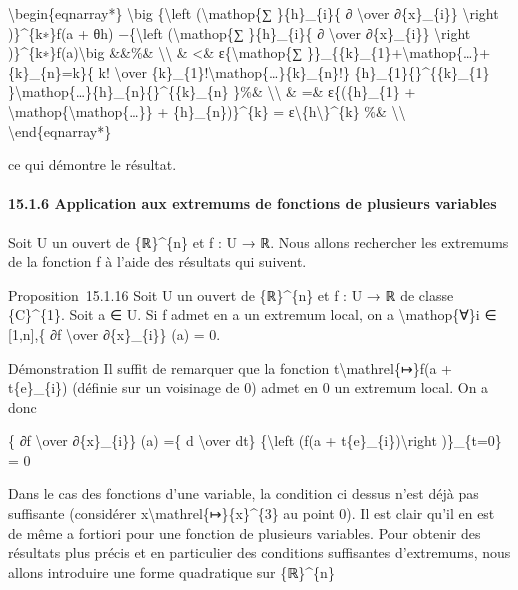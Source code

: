 \documentclass[]{article}
\begin{document}
\textbackslash{}begin\{eqnarray*\} \textbackslash{}big
\textbar{}\{\textbackslash{}left (\textbackslash{}mathop\{∑
\}\{h\}\_\{i\}\{ ∂ \textbackslash{}over ∂\{x\}\_\{i\}\}
\textbackslash{}right )\}\^{}\{k∗\}f(a + θh) −\{\textbackslash{}left
(\textbackslash{}mathop\{∑ \}\{h\}\_\{i\}\{ ∂ \textbackslash{}over
∂\{x\}\_\{i\}\} \textbackslash{}right
)\}\^{}\{k∗\}f(a)\textbackslash{}big \textbar{}\&\&\%\&
\textbackslash{}\textbackslash{} \& \textless{}\&
ε\{\textbackslash{}mathop\{∑
\}\}\_\{\{k\}\_\{1\}+\textbackslash{}mathop\{\ldots{}\}+\{k\}\_\{n\}=k\}\{
k! \textbackslash{}over
\{k\}\_\{1\}!\textbackslash{}mathop\{\ldots{}\}\{k\}\_\{n\}!\}
\textbar{}\{h\}\_\{1\}\{\textbar{}\}\^{}\{\{k\}\_\{1\}
\}\textbackslash{}mathop\{\ldots{}\}\textbar{}\{h\}\_\{n\}\{\textbar{}\}\^{}\{\{k\}\_\{n\}
\}\%\& \textbackslash{}\textbackslash{} \& =\&
ε\{(\textbar{}\{h\}\_\{1\}\textbar{} +
\textbackslash{}mathop\{\textbackslash{}mathop\{\ldots{}\}\} +
\textbar{}\{h\}\_\{n\}\textbar{})\}\^{}\{k\} =
ε\textbackslash{}\textbar{}\{h\textbackslash{}\textbar{}\}\^{}\{k\} \%\&
\textbackslash{}\textbackslash{} \textbackslash{}end\{eqnarray*\}

ce qui démontre le résultat.

\paragraph{15.1.6 Application aux extremums de fonctions de plusieurs
variables}

Soit U un ouvert de \{ℝ\}\^{}\{n\} et f : U → ℝ. Nous allons rechercher
les extremums de la fonction f à l'aide des résultats qui suivent.

Proposition~15.1.16 Soit U un ouvert de \{ℝ\}\^{}\{n\} et f : U → ℝ de
classe \{C\}\^{}\{1\}. Soit a ∈ U. Si f admet en a un extremum local, on
a \textbackslash{}mathop\{∀\}i ∈ {[}1,n{]},\{ ∂f \textbackslash{}over
∂\{x\}\_\{i\}\} (a) = 0.

Démonstration Il suffit de remarquer que la fonction
t\textbackslash{}mathrel\{↦\}f(a + t\{e\}\_\{i\}) (définie sur un
voisinage de 0) admet en 0 un extremum local. On a donc

\{ ∂f \textbackslash{}over ∂\{x\}\_\{i\}\} (a) =\{ d
\textbackslash{}over dt\} \{\textbackslash{}left (f(a +
t\{e\}\_\{i\})\textbackslash{}right )\}\_\{t=0\} = 0

Dans le cas des fonctions d'une variable, la condition ci dessus n'est
déjà pas suffisante (considérer
x\textbackslash{}mathrel\{↦\}\{x\}\^{}\{3\} au point 0). Il est clair
qu'il en est de même a fortiori pour une fonction de plusieurs
variables. Pour obtenir des résultats plus précis et en particulier des
conditions suffisantes d'extremums, nous allons introduire une forme
quadratique sur \{ℝ\}\^{}\{n\}
\end{document}
